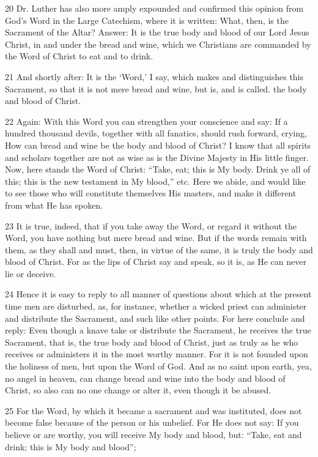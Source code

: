 20 Dr. Luther has also more amply expounded and confirmed this opinion from God’s Word in the Large Catechism, where it is written: What, then, is the Sacrament of the Altar? Answer: It is the true body and blood of our Lord Jesus Christ, in and under the bread and wine, which we Christians are commanded by the Word of Christ to eat and to drink.

21 And shortly after: It is the ‘Word,’ I say, which makes and distinguishes this Sacrament, so that it is not mere bread and wine, but is, and is called. the body and blood of Christ.

22 Again: With this Word you can strengthen your conscience and say: If a hundred thousand devils, together with all fanatics, should rush forward, crying, How can bread and wine be the body and blood of Christ? I know that all spirits and scholars together are not as wise as is the Divine Majesty in His little finger. Now, here stands the Word of Christ: “Take, eat; this is My body. Drink ye all of this; this is the new testament in My blood,” etc. Here we abide, and would like to see those who will constitute themselves His masters, and make it different from what He has spoken.

23 It is true, indeed, that if you take away the Word, or regard it without the Word, you have nothing but mere bread and wine. But if the words remain with them, as they shall and must, then, in virtue of the same, it is truly the body and blood of Christ. For as the lips of Christ say and speak, so it is, as He can never lie or deceive.

24 Hence it is easy to reply to all manner of questions about which at the present time men are disturbed, as, for instance, whether a wicked priest can administer and distribute the Sacrament, and such like other points. For here conclude and reply: Even though a knave take or distribute the Sacrament, he receives the true Sacrament, that is, the true body and blood of Christ, just as truly as he who receives or administers it in the most worthy manner. For it is not founded upon the holiness of men, but upon the Word of God. And as no saint upon earth, yea, no angel in heaven, can change bread and wine into the body and blood of Christ, so also can no one change or alter it, even though it be abused.

25 For the Word, by which it became a sacrament and was instituted, does not become false because of the person or his unbelief. For He does not say: If you believe or are worthy, you will receive My body and blood, but: “Take, eat and drink; this is My body and blood”;

